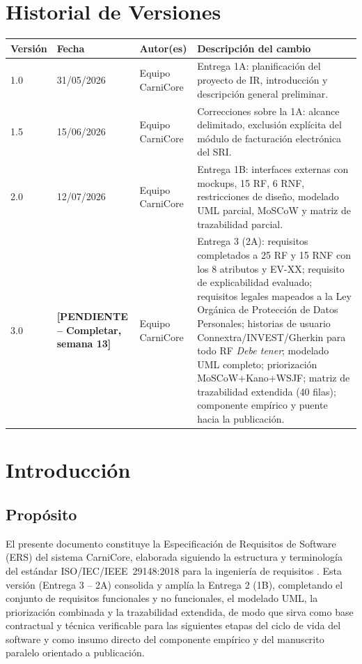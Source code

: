 \documentclass[11pt,a4paper]{article}
\newcommand{\PENDIENTE}[1]{\textcolor{pendiente}{\textbf{[PENDIENTE -- #1]}}}
\begin{document}
\section*{Historial de Versiones}
\begin{longtable}{|p{1.5cm}|p{2.2cm}|p{3cm}|p{8cm}|}
\hline
\textbf{Versión} & \textbf{Fecha} & \textbf{Autor(es)} & \textbf{Descripción del cambio} \\
\hline
1.0 & 31/05/2026 & Equipo CarniCore & Entrega 1A: planificación del proyecto de IR, introducción y descripción general preliminar. \\
\hline
1.5 & 15/06/2026 & Equipo CarniCore & Correcciones sobre la 1A: alcance delimitado, exclusión explícita del módulo de facturación electrónica del SRI. \\
\hline
2.0 & 12/07/2026 & Equipo CarniCore & Entrega 1B: interfaces externas con mockups, 15 RF, 6 RNF, restricciones de diseño, modelado UML parcial, MoSCoW y matriz de trazabilidad parcial. \\
\hline
3.0 & \PENDIENTE{Completar, semana 13} & Equipo CarniCore & Entrega 3 (2A): requisitos completados a 25 RF y 15 RNF con los 8 atributos y EV-XX; requisito de explicabilidad evaluado; requisitos legales mapeados a la Ley Orgánica de Protección de Datos Personales; historias de usuario Connextra/INVEST/Gherkin para todo RF \textit{Debe tener}; modelado UML completo; priorización MoSCoW+Kano+WSJF; matriz de trazabilidad extendida (40 filas); componente empírico y puente hacia la publicación. \\
\hline
\end{longtable}

\tableofcontents
\newpage

\section{Introducción}
\subsection{Propósito}
El presente documento constituye la Especificación de Requisitos de Software (ERS) del sistema CarniCore, elaborada siguiendo la estructura y terminología del estándar ISO/IEC/IEEE~29148:2018 para la ingeniería de requisitos \cite{iso29148}. Esta versión (Entrega 3 -- 2A) consolida y amplía la Entrega 2 (1B), completando el conjunto de requisitos funcionales y no funcionales, el modelado UML, la priorización combinada y la trazabilidad extendida, de modo que sirva como base contractual y técnica verificable para las siguientes etapas del ciclo de vida del software y como insumo directo del componente empírico y del manuscrito paralelo orientado a publicación.
\end{document}
